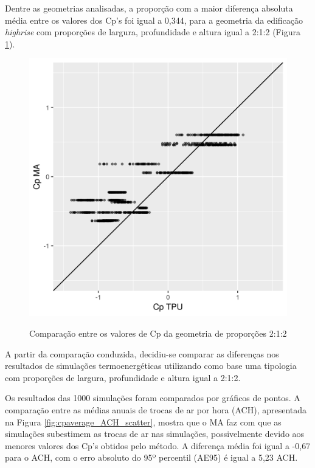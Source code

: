 \documentclass[brazil,hardcopy,openany,a4paper]{ufscthesis}
\begin{document}
		Dentre as geometrias analisadas, a proporção com a maior diferença absoluta média entre os valores dos Cp’s foi igual a 0,344, para a geometria da edificação \textit{highrise} com proporções de largura, profundidade e altura igual a 2:1:2 (Figura \ref{fig:cp_diff_scatter}).
	
		\begin{figure}[H]
			\centering
			\caption{Comparação entre os valores de Cp da geometria de proporções 2:1:2}
			\includegraphics[width=1\linewidth]{img/cp_diff_scatter.png}
			\label{fig:cp_diff_scatter}
		\end{figure}
	
		A partir da comparação conduzida, decidiu-se comparar as diferenças nos resultados de simulações termoenergéticas utilizando como base uma tipologia com proporções de largura, profundidade e altura igual a 2:1:2.
		
		Os resultados das 1000 simulações foram comparados por gráficos de pontos.
		A comparação entre as médias anuais de trocas de ar por hora (ACH), apresentada na Figura \ref{fig:cpaverage_ACH_scatter}, mostra que o MA faz com que as simulações subestimem as trocas de ar nas simulações, possivelmente devido aos menores valores dos Cp's obtidos pelo método.
		A diferença média foi igual a -0,67 para o ACH, com o erro absoluto do 95º percentil (AE95) é igual a 5,23 ACH.
		
\end{document}

